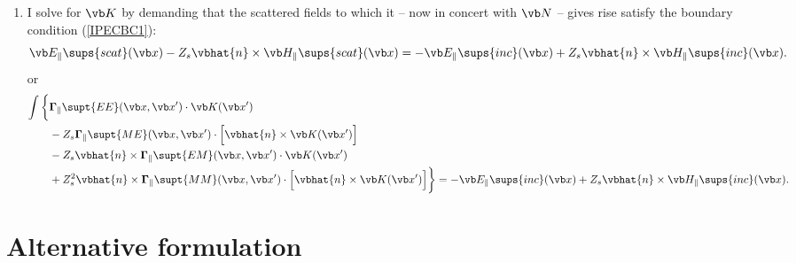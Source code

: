\documentclass{article}
\begin{document}
\begin{enumerate}
 \item I solve for $\vb K$ by demanding that the scattered fields 
       to which it -- now in concert with $\vb N$ -- gives rise 
       satisfy the boundary condition (\ref{IPECBC1}):
       $$
           \vb E_{\parallel}\sups{scat}(\vb x) 
            -Z_s \vbhat{n}\times \vb H_{\parallel}\sups{scat}(\vb x)
       = 
          -\vb E_{\parallel}\sups{inc}(\vb x) 
            +Z_s \vbhat{n}\times \vb H_{\parallel}\sups{inc}(\vb x).
       $$
       or
       \begin{align*}
       \int\bigg\{ &\BG_{\parallel}\supt{EE}(\vb x, \vb x^\prime) 
                   \cdot \vb K(\vb x^\prime)
                   \\
                   &- Z_s\BG_{\parallel}\supt{ME}(\vb x, \vb x^\prime)
                   \cdot \Big[\vbhat{n}\times \vb K(\vb x^\prime)\Big] 
                   \\
                   &-Z_s\vbhat{n}\times \BG_{\parallel}\supt{EM}(\vb x, \vb x^\prime) 
                   \cdot \vb K(\vb x^\prime)
                   \\
                   &+Z_s^2
                   \vbhat{n}\times\BG_{\parallel}\supt{MM}(\vb x, \vb x^\prime)
                   \cdot \Big[\vbhat{n}\times \vb K(\vb x^\prime)\Big]
       \bigg\}
       = -\vb E_{\parallel}\sups{inc}(\vb x) 
            +Z_s \vbhat{n}\times \vb H_{\parallel}\sups{inc}(\vb x).
       \end{align*}
\end{enumerate}

\newpage
\section{Alternative formulation}
\end{document}
